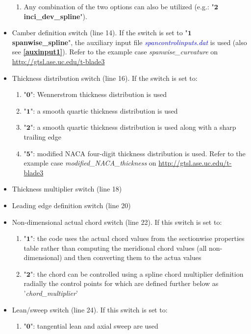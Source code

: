 \documentclass[8pt]{article}
\begin{document}
\begin{itemize}[leftmargin=*]
\begin{enumerate}[label=\alph*]
        \item Any combination of the two options can also be utilized (e.g.: "$\mathbf{2}$ \textbf{inci\_dev\_spline}"). 
    \end{enumerate}
    \item Camber definition switch (line 14). If the switch is set to "$\mathbf{1}$ \textbf{spanwise\_spline}", the auxiliary input file \textit{\textcolor{blue}{spancontrolinputs.dat}} is used (also see \textbf{\ref{auxinput1}}). Refer to the example case \textit{spanwise\_curvature} on \url{http://gtsl.ase.uc.edu/t-blade3}
    \item Thickness distribution switch (line 16). If the switch is set to:
    \begin{enumerate}[label=\alph*]
        \item "$\mathbf{0}$": Wennerstrom thickness distribution is used
        \item "$\mathbf{1}$": a smooth quartic thickness distribution is used
        \item "$\mathbf{2}$": a smooth quartic thickness distribution is used along with a sharp trailing edge
        \item "$\mathbf{5}$": modified NACA four-digit thickness distribution is used. Refer to the example case \textit{modified\_NACA\_thickness} on \url{http://gtsl.ase.uc.edu/t-blade3}
    \end{enumerate}
    \item Thickness multiplier switch (line 18)
    \item Leading edge definition switch (line 20)
    \item Non-dimensional actual chord switch (line 22). If this switch is set to:
    \begin{enumerate}[label=\alph*]
        \item "$\mathbf{1}$": the code uses the actual chord values from the sectionwise properties table rather than computing the meridional chord values (all non-dimensional) and then converting them to the actua values
        \item "$\mathbf{2}$": the chord can be controlled using a spline chord multiplier definition radially the control points for which are defined further below as '\textit{chord\_multiplier}'
    \end{enumerate}
    \item Lean/sweep switch (line 24). If this switch is set to:
    \begin{enumerate}[label=\alph*]
        \item "$\mathbf{0}$": tangential lean and axial sweep are used

\end{enumerate}
\end{itemize}
\end{document}
